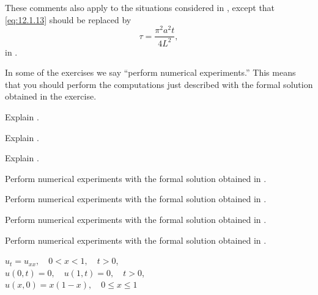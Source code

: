These comments also apply to the situations considered
in , except
that \eqref{eq:12.1.13} should be replaced by
\[
\tau=\frac{\pi^2a^2t}{4L^2},
\]
 in .

In some of the exercises we
 say ``perform numerical experiments.''
This means that you should  perform the computations
just described with the formal solution obtained
in the  exercise.

\exercises
\begin{exerciselist}
\item\label{exer:12.1.1}Explain .

\item\label{exer:12.1.2}Explain  .

\item\label{exer:12.1.3}Explain .


\item\label{exer:12.1.4}\Cex
Perform numerical experiments with the formal solution
obtained in .

\item\label{exer:12.1.5}\Cex
Perform numerical experiments with the formal solution
obtained in .

\item\label{exer:12.1.6}\Cex
Perform numerical experiments with the formal solution
obtained in .

\item\label{exer:12.1.7}\Cex
Perform numerical experiments with the formal solution
obtained in .



\item\label{exer:12.1.8}$u_t=u_{xx},\quad 0<x<1,\quad t>0$,\\
$u(0,t)=0,\quad u(1,t)=0,\quad t>0$,\\
$u(x,0)=x(1-x),\quad 0\le x\le 1$


\end{exerciselist}
